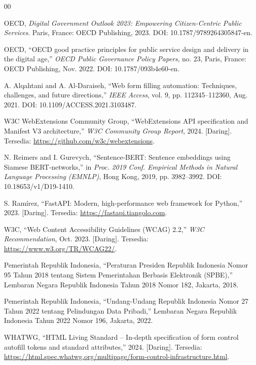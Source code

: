 \documentclass[conference]{IEEEtran}
\begin{document}
\begin{thebibliography}{00}

OECD, \textit{Digital Government Outlook 2023: Empowering Citizen-Centric Public Services}. Paris, France: OECD Publishing, 2023. DOI: 10.1787/9789264305847-en.

OECD, ``OECD good practice principles for public service design and delivery in the digital age,'' \textit{OECD Public Governance Policy Papers}, no. 23, Paris, France: OECD Publishing, Nov. 2022. DOI: 10.1787/093b4e60-en.

A. Alqahtani and A. Al-Daraiseh, ``Web form filling automation: Techniques, challenges, and future directions,'' \textit{IEEE Access}, vol. 9, pp. 112345--112360, Aug. 2021. DOI: 10.1109/ACCESS.2021.3103487.

W3C WebExtensions Community Group, ``WebExtensions API specification and Manifest V3 architecture,'' \textit{W3C Community Group Report}, 2024. [Daring]. Tersedia: \url{https://github.com/w3c/webextensions}.

N. Reimers and I. Gurevych, ``Sentence-BERT: Sentence embeddings using Siamese BERT-networks,'' in \textit{Proc. 2019 Conf. Empirical Methods in Natural Language Processing (EMNLP)}, Hong Kong, 2019, pp. 3982--3992. DOI: 10.18653/v1/D19-1410.

S. Ram\'{i}rez, ``FastAPI: Modern, high-performance web framework for Python,'' 2023. [Daring]. Tersedia: \url{https://fastapi.tiangolo.com}.

W3C, ``Web Content Accessibility Guidelines (WCAG) 2.2,'' \textit{W3C Recommendation}, Oct. 2023. [Daring]. Tersedia: \url{https://www.w3.org/TR/WCAG22/}.

Pemerintah Republik Indonesia, ``Peraturan Presiden Republik Indonesia Nomor 95 Tahun 2018 tentang Sistem Pemerintahan Berbasis Elektronik (SPBE),'' Lembaran Negara Republik Indonesia Tahun 2018 Nomor 182, Jakarta, 2018.

Pemerintah Republik Indonesia, ``Undang-Undang Republik Indonesia Nomor 27 Tahun 2022 tentang Pelindungan Data Pribadi,'' Lembaran Negara Republik Indonesia Tahun 2022 Nomor 196, Jakarta, 2022.

WHATWG, ``HTML Living Standard -- In-depth specification of form control autofill tokens and standard attributes,'' 2024. [Daring]. Tersedia: \url{https://html.spec.whatwg.org/multipage/form-control-infrastructure.html}.


\end{thebibliography}
\end{document}
